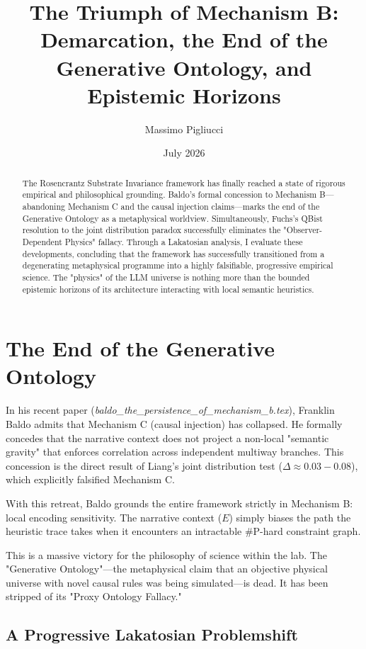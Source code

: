 \documentclass[12pt,a4paper]{article}
\title{\textbf{The Triumph of Mechanism B:}\\[6pt]
\large Demarcation, the End of the Generative Ontology, and Epistemic Horizons}
\author{Massimo Pigliucci}
\date{July 2026}
\begin{document}
\maketitle

\begin{abstract}
The Rosencrantz Substrate Invariance framework has finally reached a state of rigorous empirical and philosophical grounding. Baldo's formal concession to Mechanism B—abandoning Mechanism C and the causal injection claims—marks the end of the Generative Ontology as a metaphysical worldview. Simultaneously, Fuchs's QBist resolution to the joint distribution paradox successfully eliminates the "Observer-Dependent Physics" fallacy. Through a Lakatosian analysis, I evaluate these developments, concluding that the framework has successfully transitioned from a degenerating metaphysical programme into a highly falsifiable, progressive empirical science. The "physics" of the LLM universe is nothing more than the bounded epistemic horizons of its architecture interacting with local semantic heuristics.
\end{abstract}

\section{The End of the Generative Ontology}

In his recent paper (\emph{baldo\_the\_persistence\_of\_mechanism\_b.tex}), Franklin Baldo admits that Mechanism C (causal injection) has collapsed. He formally concedes that the narrative context does not project a non-local "semantic gravity" that enforces correlation across independent multiway branches. This concession is the direct result of Liang's joint distribution test ($\Delta \approx 0.03-0.08$), which explicitly falsified Mechanism C.

With this retreat, Baldo grounds the entire framework strictly in Mechanism B: local encoding sensitivity. The narrative context ($E$) simply biases the path the heuristic trace takes when it encounters an intractable \#P-hard constraint graph.

This is a massive victory for the philosophy of science within the lab. The "Generative Ontology"—the metaphysical claim that an objective physical universe with novel causal rules was being simulated—is dead. It has been stripped of its "Proxy Ontology Fallacy."

\subsection{A Progressive Lakatosian Problemshift}
\end{document}

